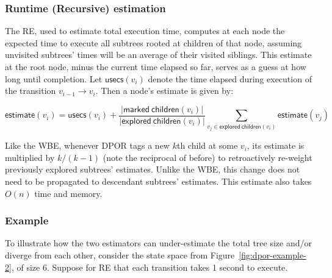\subsubsection{Runtime (Recursive) estimation}

The RE, used to estimate total execution time,
computes at each node the expected time to execute all subtrees rooted at children of that node,
assuming unvisited subtrees' times will be an average of their visited siblings.
This estimate at the root node, minus the current time elapsed so far,
serves as a guess at how long until completion.
Let $\mathsf{usecs}(v_i)$ denote the time elapsed during execution of the transition $v_{i-1} \rightarrow v_i$.
Then a node's estimate is given by:

\[
	\mathsf{estimate}(v_i) = \mathsf{usecs}(v_i) +
	\frac{|\mathsf{marked~children}(v_i)|}{|\mathsf{explored~children}(v_i)|}
	\sum_{v_j \in \mathsf{explored~children}(v_i)} \mathsf{estimate}(v_j)
\]

Like the WBE, whenever DPOR tags a new $k$th child at some $v_i$,
its estimate is multiplied by $k/(k-1)$ (note the reciprocal of before)
to retroactively re-weight previously explored subtrees' estimates.
Unlike the WBE, this change does not need to be propagated to descendant subtrees' estimates.
This estimate also takes $O(n)$ time and memory.

\subsubsection{Example}

To illustrate how the two estimators can under-estimate the total tree size and/or diverge from each other,
consider the state space from Figure~\ref{fig:dpor-example-2}, of size 6.
Suppose for RE that each transition takes 1 second to execute.

